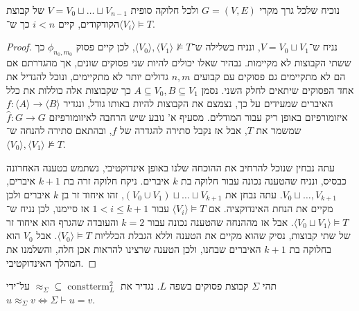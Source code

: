 \subquestion{}
נוכיח שלכל גרך מקרי $G = (V, E)$ ולכל חלוקה סופית $V = V_0 \sqcup \dots \sqcup V_{n - 1}$ של קבוצת הקודקודים, קיים $i < n$ כך ש־$\langle V_i \rangle \models T$.
\begin{proof}
	נניח ש־$V = V_0 \sqcup V_1$, ונניח בשלילה ש־$\langle V_0 \rangle, \langle V_1 \rangle \not\models T$, לכן קיים פסוק $\phi_{n_0, m_0}$ כך ששתי הקבוצות לא מקיימות.
	נבהיר שאלו יכולים להיות שני פסוקים שונים, אך מהגדרתם אם הם לא מתקיימים גם פסוקים עם קבועים $n, m$ גדולים יותר לא מתקיימים, ונוכל להגדיל את אחד הפסוקים שיתאים לחלק השני.
	נסמן $A \subseteq V_0, B \subseteq V_1$ כך שקבוצות אלה כוללות את כלל האיברים שמעידים על כך, נצמצם את הקבוצות להיות באותו גודל, ונגדיר $f : \langle A \rangle \to \langle B \rangle$ איזומורפיזם באופן ריק עבור המודלים.
	מסעיף א' נובע שיש הרחבה לאיזומורפיזם $\hat{f} : G \to G$ שמשמר את $T$, אבל אז נקבל סתירה להגדרה של $f$, ובהתאם סתירה להנחה ש־$\langle V_0 \rangle, \langle V_1 \rangle \not\models T$.

	עתה נבחין שנוכל להרחיב את ההוכחה שלנו באופן אינדוקטיבי, נשתמש בטענה האחרונה כבסיס, ונניח שהטענה נכונה עבור חלוקה בת $k$ איברים.
	ניקח חלוקה זרה בת $k + 1$ איברים, $V_0 \sqcup \dots, V_{k + 1}$.
	עתה נבחן את $(V_0 \cup V_1) \sqcup \dots \sqcup V_{k + 1}$, זהו איחוד זר בן $k$ איברים ולכן מקיים את הנחת האינדוקציה.
	אם $\langle V_i \rangle \models T$ עבור $1 < i \le k + 1$ אז סיימנו, לכן נניח ש־$\langle V_0 \sqcup V_1 \rangle \models T$.
	אבל אז מההנחה שהטענה נכונה עבור $k = 2$ והעובדה שהגרף הוא איחוד זר של שתי קבוצות, נסיק שהוא מקיים את הטענה וללא הגבלת הכלליות $\langle V_0 \rangle \models T$.
	אבל $V_0$ הוא בחלוקה בת $k + 1$ האיברים שבחנו, ולכן הטענה שרצינו להראות אכן חלה, והשלמנו את המהלך האינדוקטיבי.
\end{proof}

\question{}
תהי $\Sigma$ קבוצת פסוקים בשפה $L$.
נגדיר את $\approx_\Sigma \subseteq \operatorname{constterm}_L^2$ על־ידי $u \approx_\Sigma v \iff \Sigma \vdash u = v$.

